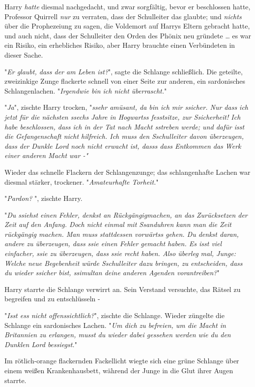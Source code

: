 {Harry \emph{hatte} diesmal nachgedacht, und zwar sorgfältig, bevor er beschlossen hatte, Professor Quirrell \emph{nur} zu verraten, dass der Schulleiter das glaubte; und \emph{nichts} über die Prophezeiung zu sagen, die Voldemort auf Harrys Eltern gebracht hatte, und auch nicht, dass der Schulleiter den Orden des Phönix neu gründete … es war ein Risiko, ein erhebliches Risiko, aber Harry brauchte einen Verbündeten in dieser Sache.

"\emph{Er glaubt, dass der am Leben ist?}", sagte die Schlange schließlich. Die geteilte, zweizinkige Zunge flackerte schnell von einer Seite zur anderen, ein sardonisches Schlangenlachen. "\emph{Irgendwie bin ich nicht überrascht.}"

"\emph{Ja}", zischte Harry trocken, "\emph{ssehr amüsant, da bin ich mir ssicher. Nur dass ich jetzt für die nächsten ssechs Jahre in Hogwartss fesstsitze, zur Ssicherheit! Ich habe beschlossen, dass ich in der Tat nach Macht sstreben werde; und dafür isst die Gefangenschaft nicht hilfreich. Ich muss den Sschulleiter davon überzeugen, dass der Dunkle Lord noch nicht erwacht ist, dasss dass Entkommen das Werk einer anderen Macht war -"}

Wieder das schnelle Flackern der Schlangenzunge; das schlangenhafte Lachen war diesmal stärker, trockener. "\emph{Amateurhafte Torheit.}"

"\emph{Pardon?} ", zischte Harry.

"\emph{Du ssiehst einen Fehler, denkst an Rückgängigmachen, an das Zurücksetzen der Zeit auf den Anfang. Doch nicht einmal mit Ssanduhren kann man die Zeit rückgängig machen. Man muss stattdessen vorwärtss gehen. Du denkst daran, andere zu überzeugen, dass ssie einen Fehler gemacht haben. Es isst viel einfacher, ssie zu überzeugen, dass ssie recht haben. Also überleg mal, Junge: Welche neue Begebenheit würde Sschulleiter dazu bringen, zu entscheiden, dass du wieder ssicher bist, ssimultan deine anderen Agenden vorantreiben?}"

Harry starrte die Schlange verwirrt an. Sein Verstand versuchte, das Rätsel zu begreifen und zu entschlüsseln -

"\emph{Isst ess nicht offenssichtlich?}", zischte die Schlange. Wieder züngelte die Schlange ein sardonisches Lachen. "\emph{Um dich zu befreien, um die Macht in Britannien zu erlangen, musst du wieder dabei gessehen werden wie du den Dunklen Lord bessiegst.}"

Im rötlich-orange flackernden Fackellicht wiegte sich eine grüne Schlange über einem weißen Krankenhausbett, während der Junge in die Glut ihrer Augen starrte.

}
